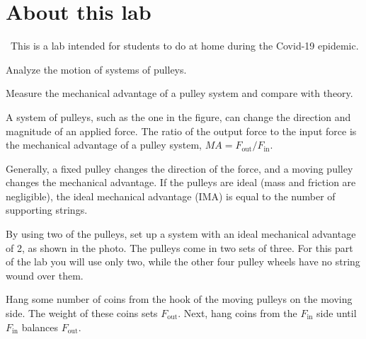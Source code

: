 \addtocounter{chapter}{-1}
\renewcommand\thechapter{c1.12}
\label{lab:covid-mechanical-advantage}

\section*{About this lab}

\covid\ 
This is a lab intended for students to do at home during the Covid-19 epidemic. 

\apparatus
{}

\begin{goals}

\item[] Analyze the motion of systems of pulleys.

\item[] Measure the mechanical advantage of a pulley system and compare with theory.

\end{goals}

\introduction

A system of pulleys, such as the one in the figure, can change the direction and magnitude of an
applied force. The ratio of the output force to the input force is the
mechanical advantage of a pulley system, $MA =F_\text{out}/F_\text{in}$.


Generally, a fixed pulley changes the direction of the force, and a
moving pulley changes the mechanical advantage. If the pulleys are
ideal (mass and friction are negligible), the ideal mechanical
advantage (IMA) is equal to the number of supporting strings.

\observations 

By using two of the pulleys, set up a system with an ideal mechanical advantage of 2,
as shown in the photo. The pulleys come in two sets of three. For this part of the lab you will use only two, while
the other four pulley wheels have no string wound over them.


Hang some number of coins from the hook of the moving pulleys on the moving side. The weight of these coins sets
$F_\text{out}$. Next, hang coins from the $F_\text{in}$ side until $F_\text{in}$ balances $F_\text{out}$. 

